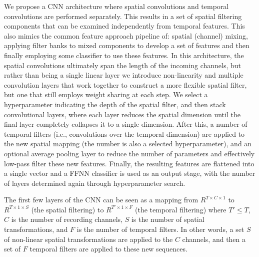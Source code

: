 \documentclass[utf8]{frontiersSCNS} %
\begin{document}
We propose a CNN architecture where spatial convolutions and temporal convolutions are performed separately. This results in a set of spatial filtering components that can be examined independently from temporal features. This also mimics the common feature approach pipeline of: spatial (channel) mixing, applying filter banks to mixed components to develop a set of features and then finally employing some classifier to use these features. In this architecture, the spatial convolutions ultimately span the length of the incoming channels, but rather than being a single linear layer we introduce non-linearity and multiple convolution layers that work together to construct a more flexible spatial filter, but one that still employs weight sharing at each step. We select a hyperparameter indicating the depth of the spatial filter, and then stack convolutional layers, where each layer reduces the spatial dimension until the final layer completely collapses it to a single dimension. After this, a number of temporal filters (i.e., convolutions over the temporal dimension) are applied to the new spatial mapping (the number is also a selected hyperparameter), and an optional average pooling layer to reduce the number of parameters and effectively low-pass filter these new features. Finally, the resulting features are flattened into a single vector and a FFNN classifier is used as an output stage, with the number of layers determined again through hyperparameter search.

The first few layers of the CNN can be seen as a mapping from $R^{T \times C \times 1}$ to $R^{T \times 1 \times S}$ (the spatial filtering) to $R^{T' \times 1 \times F }$ (the temporal filtering) where $T' \leq T$, $C$ is the number of recording channels, $S$ is the number of spatial transformations, and $F$ is the number of temporal filters. In other words, a set $S$ of non-linear spatial transformations are applied to the $C$ channels, and then a set of $F$ temporal filters are applied to these new sequences.
\end{document}

